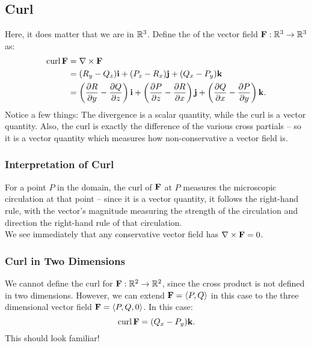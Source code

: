 \subsection{Curl}

Here, it does matter that we are in \(\mathbb{R}^{3}\). Define the  of the vector field \(\mathbf{F} : \mathbb{R}^3 \to \mathbb{R}^3\) as:
\begin{align*}
    \text{curl} \, \mathbf{F} &= \nabla \times \mathbf{F} \\
    &= (R_y - Q_z) \mathbf{i} + (P_z - R_x) \mathbf{j} + (Q_x - P_y) \mathbf{k} \\
    &= \left( \frac{\partial R}{\partial y} - \frac{\partial Q}{\partial z} \right) \mathbf{i} + \left( \frac{\partial P}{\partial z} - \frac{\partial R}{\partial x} \right) \mathbf{j} + \left( \frac{\partial Q}{\partial x} - \frac{\partial P}{\partial y} \right) \mathbf{k}.
\end{align*} 
Notice a few things: The divergence is a scalar quantity, while the curl is a vector quantity. Also, the curl is exactly the difference of the various cross partials – so it is a vector quantity which measures how non-conservative a vector field is.

\subsubsection{Interpretation of Curl}

For a point \(P\) in the domain, the curl of \(\mathbf{F}\) at \(P\) measures the microscopic circulation at that point – since it is a vector quantity, it follows the right-hand rule, with the vector’s magnitude measuring the strength of the circulation and direction the right-hand rule of that circulation. \\

We see immediately that any conservative vector field has \(\nabla \times \mathbf{F} = 0\).

\subsubsection{Curl in Two Dimensions}

We cannot define the curl for \(\mathbf{F} : \mathbb{R}^2 \to \mathbb{R}^2\), since the cross product is not defined in two dimensions. However, we can extend \(\mathbf{F} = \langle P,Q \rangle\) in this case to the three dimensional vector field \(\mathbf{F} = \langle P, Q, 0 \rangle\). In this case:
\[
    \text{curl} \, \mathbf{F} = (Q_x - P_y) \mathbf{k}.
\]
This should look familiar! \\

